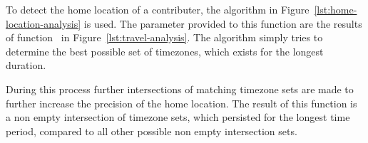 To detect the home location of a contributer, the algorithm in Figure~\ref{lst:home-location-analysis} is used.
The parameter provided to this function are the results of function~ in Figure~\ref{lst:travel-analysis}.
The algorithm simply tries to determine the best possible set of timezones, which exists for the longest duration.

During this process further intersections of matching timezone sets are made to further increase the precision of the home location.
The result of this function is a non empty intersection of timezone sets, which persisted for the longest time period, compared to all other possible non empty intersection sets.
